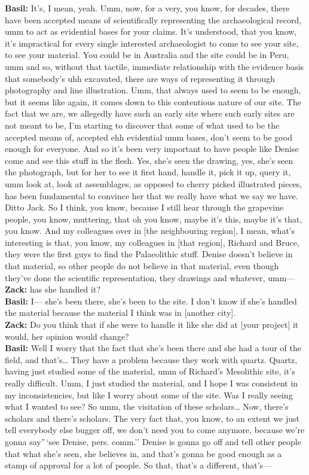 \documentclass[
  canadian,
]{article}
\begin{document}
\textbf{Basil:} It's, I mean, yeah. Umm, now, for a very, you know, for
decades, there have been accepted means of scientifically representing
the archaeological record, umm to act as evidential bases for your
claims. It's understood, that you know, it's impractical for every
single interested archaeologist to come to see your site, to see your
material. You could be in Australia and the site could be in Peru, umm
and so, without that tactile, immediate relationship with the evidence
basis that somebody's uhh excavated, there are ways of representing it
through photography and line illustration. Umm, that always used to seem
to be enough, but it seems like again, it comes down to this contentious
nature of our site. The fact that we are, we allegedly have such an
early site where such early sites are not meant to be, I'm starting to
discover that some of what used to be the accepted means of, accepted
ehh evidential umm bases, don't seem to be good enough for everyone. And
so it's been very important to have people like Denise come and see this
stuff in the flesh. Yes, she's seen the drawing, yes, she's seen the
photograph, but for her to see it first hand, handle it, pick it up,
query it, umm look at, look at assemblages, as opposed to cherry picked
illustrated pieces, has been fundamental to convince her that we really
have what we say we have. Ditto Jack. So I think, you know, because I
still hear through the grapevine people, you know, muttering, that oh
you know, maybe it's this, maybe it's that, you know. And my colleagues
over in {[}the neighbouring region{]}, I mean, what's interesting is
that, you know, my colleagues in {[}that region{]}, Richard and Bruce,
they were the first guys to find the Palaeolithic stuff. Denise doesn't
believe in that material, so other people do not believe in that
material, even though they've done the scientific representation, they
drawings and whatever, umm---\\
\textbf{Zack:} has she handled it?\\
\textbf{Basil:} I--- she's been there, she's been to the site. I don't
know if she's handled the material because the material I think was in
{[}another city{]}.\\
\textbf{Zack:} Do you think that if she were to handle it like she did
at {[}your project{]} it would, her opinion would change?\\
\textbf{Basil:} Well I worry that the fact that she's been there and she
had a tour of the field, and that's\ldots{} They have a problem because
they work with quartz. Quartz, having just studied some of the material,
umm of Richard's Mesolithic site, it's really difficult. Umm, I just
studied the material, and I hope I was consistent in my inconsistencies,
but like I worry about some of the site. Was I really seeing what I
wanted to see? So umm, the visitation of these scholars\ldots{} Now,
there's scholars and there's scholars. The very fact that, you know, to
an extent we just tell everybody else bugger off, we don't need you to
come anymore, because we're gonna say''\,`see Denise, pers. comm.''
Denise is gonna go off and tell other people that what she's seen, she
believes in, and that's gonna be good enough as a stamp of approval for
a lot of people. So that, that's a different, that's---
\end{document}
